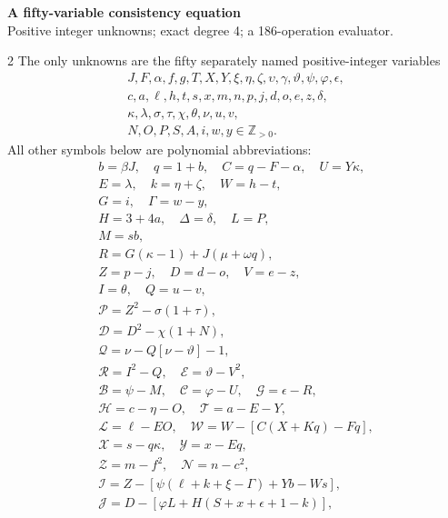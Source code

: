 \documentclass[10pt]{article}
\begin{document}
\begin{center}
{\large\bfseries A fifty-variable consistency equation}\\[-1pt]
{\small Positive integer unknowns; exact degree 4; a 186-operation evaluator.}
\end{center}\vspace{-8pt}
\begin{multicols}{2}
\fontsize{8.6}{9.1}\selectfont
The only unknowns are the fifty separately named positive-integer variables
\[
\begin{gathered}J,F,\alpha,f,g,T,X,Y,\xi,\eta,\zeta,\upsilon,\gamma,\vartheta,\psi,\varphi,\epsilon,\\
c,a,\ell,h,t,s,x,m,n,p,j,d,o,e,z,\delta,\\
\kappa,\lambda,\sigma,\tau,\chi,\theta,\nu,u,v,\\
N,O,P,S,A,i,w,y\in\mathbb Z_{>0}.\end{gathered}
\]
All other symbols below are polynomial abbreviations:
\[
\begin{gathered}
b=\beta J,\quad q=1+b,\quad C=q-F-\alpha,\quad U=Y\kappa,\\
E=\lambda,\quad k=\eta+\zeta,\quad W=h-t,\\
G=i,\quad\Gamma=w-y,\\
H=3+4a,\quad\Delta=\delta,\quad L=P,\\
M=sb,\\
R=G(\kappa-1)+J(\mu+\omega q),\\
Z=p-j,\quad D=d-o,\quad V=e-z,\\
I=\theta,\quad Q=u-v,\\
\mathcal{P}=Z^2-\sigma(1+\tau),\\
\mathcal{D}=D^2-\chi(1+N),\\
\mathcal{Q}=\nu-Q[\nu-\vartheta]-1,\\
\mathcal{R}=I^2-Q,\quad \mathcal{E}=\vartheta-V^2,\\
\mathcal{B}=\psi-M,\quad \mathcal{C}=\varphi-U,\quad \mathcal{G}=\epsilon-R,\\
\mathcal{H}=c-\eta-O,\quad \mathcal{T}=a-E-Y,\\
\mathcal{L}=\ell-EO,\quad \mathcal{W}=W-[C(X+Kq)-Fq],\\
\mathcal{X}=s-q\kappa,\quad \mathcal{Y}=x-Eq,\\
\mathcal{Z}=m-f^2,\quad \mathcal{N}=n-c^2,\\
\mathcal{I}=Z-[\psi(\ell+k+\xi-\Gamma)+Yb-Ws],\\
\mathcal{J}=D-[\varphi L+H(S+x+\epsilon+1-k)],\\

\end{gathered}\]
\end{multicols}
\end{document}

